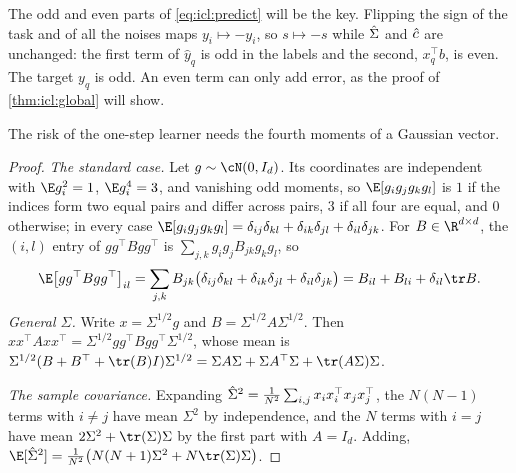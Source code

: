 \begin{refsection}
The odd and even parts of \eqref{eq:icl:predict} will be the key. Flipping the sign of the task and of all the noises maps $y_i\mapsto-y_i$, so $s\mapsto-s$ while $\hat\Sigma$ and $\hat c$ are unchanged: the first term of $\hat y_q$ is odd in the labels and the second, $x_q^\top b$, is even. The target $y_q$ is odd. An even term can only add error, as the proof of \cref{thm:icl:global} will show.

The risk of the one-step learner needs the fourth moments of a Gaussian vector.


\begin{proof}
\emph{The standard case.} Let $g\sim\cN(0,I_d)$. Its coordinates are independent with $\E g_i^2=1$, $\E g_i^4=3$, and vanishing odd moments, so $\E[g_ig_jg_kg_l]$ is $1$ if the indices form two equal pairs and differ across pairs, $3$ if all four are equal, and $0$ otherwise; in every case $\E[g_ig_jg_kg_l]=\delta_{ij}\delta_{kl}+\delta_{ik}\delta_{jl}+\delta_{il}\delta_{jk}$. For $B\in\R^{d\times d}$, the $(i,l)$ entry of $gg^\top Bgg^\top$ is $\sum_{j,k}g_ig_jB_{jk}g_kg_l$, so
\[
  \E\bigl[gg^\top Bgg^\top\bigr]_{il}=\sum_{j,k}B_{jk}\bigl(\delta_{ij}\delta_{kl}+\delta_{ik}\delta_{jl}+\delta_{il}\delta_{jk}\bigr)=B_{il}+B_{li}+\delta_{il}\tr B .
\]
\emph{General $\Sigma$.} Write $x=\Sigma^{1/2}g$ and $B=\Sigma^{1/2}A\Sigma^{1/2}$. Then $xx^\top Axx^\top=\Sigma^{1/2}gg^\top Bgg^\top\Sigma^{1/2}$, whose mean is $\Sigma^{1/2}(B+B^\top+\tr(B)I)\Sigma^{1/2}=\Sigma A\Sigma+\Sigma A^\top\Sigma+\tr(A\Sigma)\Sigma$.

\emph{The sample covariance.} Expanding $\hat\Sigma^2=\frac1{N^2}\sum_{i,j}x_ix_i^\top x_jx_j^\top$, the $N(N-1)$ terms with $i\ne j$ have mean $\Sigma^2$ by independence, and the $N$ terms with $i=j$ have mean $2\Sigma^2+\tr(\Sigma)\Sigma$ by the first part with $A=I_d$. Adding, $\E[\iclShat^2]=\frac1{N^2}\bigl(N(N+1)\Sigma^2+N\tr(\Sigma)\Sigma\bigr)$.
\end{proof}


\end{refsection}
